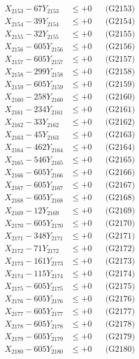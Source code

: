 \documentclass[a4paper,10pt]{article}
\begin{document}
{\begin{align}
X_{2153} - 67Y_{2153} &\leq +0 && \text{(G2153)} \\
X_{2154} - 39Y_{2154} &\leq +0 && \text{(G2154)} \\
X_{2155} - 32Y_{2155} &\leq +0 && \text{(G2155)} \\
X_{2156} - 605Y_{2156} &\leq +0 && \text{(G2156)} \\
X_{2157} - 605Y_{2157} &\leq +0 && \text{(G2157)} \\
X_{2158} - 299Y_{2158} &\leq +0 && \text{(G2158)} \\
X_{2159} - 605Y_{2159} &\leq +0 && \text{(G2159)} \\
X_{2160} - 258Y_{2160} &\leq +0 && \text{(G2160)} \\
\allowbreak
X_{2161} - 234Y_{2161} &\leq +0 && \text{(G2161)} \\
X_{2162} - 33Y_{2162} &\leq +0 && \text{(G2162)} \\
X_{2163} - 45Y_{2163} &\leq +0 && \text{(G2163)} \\
X_{2164} - 462Y_{2164} &\leq +0 && \text{(G2164)} \\
X_{2165} - 546Y_{2165} &\leq +0 && \text{(G2165)} \\
X_{2166} - 605Y_{2166} &\leq +0 && \text{(G2166)} \\
X_{2167} - 605Y_{2167} &\leq +0 && \text{(G2167)} \\
X_{2168} - 605Y_{2168} &\leq +0 && \text{(G2168)} \\
X_{2169} - 12Y_{2169} &\leq +0 && \text{(G2169)} \\
X_{2170} - 605Y_{2170} &\leq +0 && \text{(G2170)} \\
\allowbreak
X_{2171} - 348Y_{2171} &\leq +0 && \text{(G2171)} \\
X_{2172} - 71Y_{2172} &\leq +0 && \text{(G2172)} \\
X_{2173} - 161Y_{2173} &\leq +0 && \text{(G2173)} \\
X_{2174} - 115Y_{2174} &\leq +0 && \text{(G2174)} \\
X_{2175} - 605Y_{2175} &\leq +0 && \text{(G2175)} \\
X_{2176} - 605Y_{2176} &\leq +0 && \text{(G2176)} \\
X_{2177} - 605Y_{2177} &\leq +0 && \text{(G2177)} \\
X_{2178} - 605Y_{2178} &\leq +0 && \text{(G2178)} \\
X_{2179} - 605Y_{2179} &\leq +0 && \text{(G2179)} \\
X_{2180} - 605Y_{2180} &\leq +0 && \text{(G2180)} \\

\end{align}}
\end{document}
